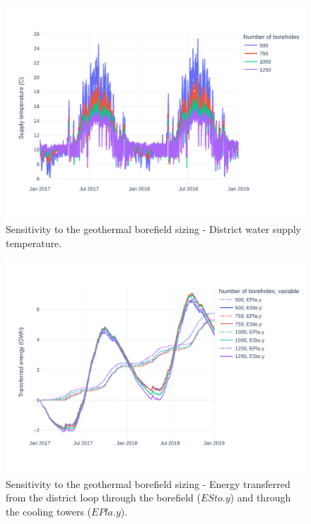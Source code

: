 \begin{figure}[!htbp]
\centering
\includegraphics[width=\linewidth]{figures/GeoSizing.pdf}
\caption{Sensitivity to the geothermal borefield sizing - District water supply temperature.}
\label{fig:geo_sizing}
\end{figure}

\begin{figure}[!htbp]
\centering
\includegraphics[width=\linewidth]{figures/GeoSizingE.pdf}
\caption{Sensitivity to the geothermal borefield sizing - Energy transferred from the district loop through the borefield ($ESto.y$) and through the cooling towers ($EPla.y$).}
\label{fig:geo_cooling}
\end{figure}


